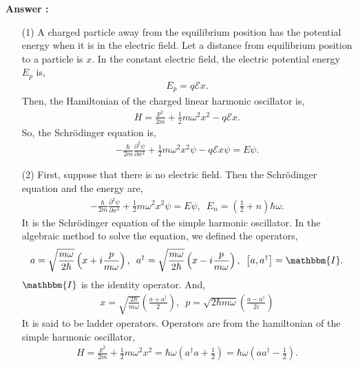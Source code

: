 \documentclass[floatfix,nofootinbib,superscriptaddress,fleqn]{revtex4-2}
\begin{document}
\noindent \textbf{Answer : }
\begin{itemize}
  \item[(1)] A charged particle away from the equilibrium position 
  has the potential energy when it is in the electric field. 
  Let a distance from equilibrium position to a particle is $x$.
  In the constant electric field, 
  the electric potential energy $E_p$ is,
  \begin{align}
    E_p = q\mathcal{E}x.
  \end{align} 
  Then, the Hamiltonian of the charged linear
  harmonic oscillator is,
  \begin{align}\label{eq:1-1}
    H = \frac{p^2}{2m}+\frac{1}{2}m\omega^2x^2-q\mathcal{E}x.
  \end{align}
  So, the Schr\"odinger equation is,
  \begin{align}\label{eq:1-2}
    -\frac{\hbar}{2m}\frac{\partial^2\psi}{\partial x^2}
    +\frac{1}{2}m\omega^2x^2\psi
    -q\mathcal{E}x\psi = E\psi.
  \end{align}
  \item[(2)] First, suppose that there is no electric field.
  Then the Schr\"odinger equation and 
  the energy are,
  \begin{align*}
    -\frac{\hbar}{2m}\frac{\partial^2\psi}{\partial x^2}
    +\frac{1}{2}m\omega^2x^2\psi = E\psi,\,\,\, 
    E_n = \left(\frac{1}{2}+n\right)\hbar\omega.
  \end{align*}
  It is the Schr\"odinger equation of the simple harmonic oscillator. 
  In the algebraic method to solve the equation, 
  we defined the operators,
  \begin{align*}
      a = \sqrt{\frac{m\omega}{2\hbar}}
      \left(x+i\frac{p}{m\omega}\right),\,\,\,
      a^\dagger = \sqrt{\frac{m\omega}{2\hbar}}
      \left(x-i\frac{p}{m\omega}\right),\,\,\,
      \left[a,a^\dagger\right] = \mathbbm{I}.
  \end{align*}
  $\mathbbm{I}$ is the identity operator. And,
  \begin{align*}
    x = \sqrt{\frac{2\hbar}{m\omega}}
    \left(\frac{a+a^\dagger}{2}\right),\,\,\,
    p = \sqrt{2\hbar m\omega}
    \left(\frac{a-a^\dagger}{2i}\right)
  \end{align*}
  It is said to be ladder operators. Operators are 
  from the hamiltonian of 
  the simple harmonic oscillator,
  \begin{align}\label{eq:1-3}
    H = \frac{p^2}{2m}+\frac{1}{2}m\omega^2x^2 
    = \hbar\omega\left(a^\dagger a + \frac{1}{2}\right)
    = \hbar\omega\left(a a^\dagger - \frac{1}{2}\right).

\end{align}
\end{itemize}
\end{document}
